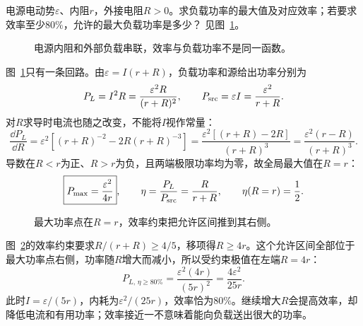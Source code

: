 \begin{exercise}[负载功率与效率的不同极值]\label{ex:c1-h8}
电源电动势$\varepsilon$、内阻$r$，外接电阻$R>0$。求负载功率的最大值及对应效率；若要求效率至少$80\%$，允许的最大负载功率是多少？ 见图~\ref{fig:c1-h8-q}。
\end{exercise}

\begin{figure}[H]\centering
{}
\caption{电源内阻和外部负载串联，效率与负载功率不是同一函数。}\label{fig:c1-h8-q}
\end{figure}
\begin{solution}
图~\ref{fig:c1-h8-q}只有一条回路。由$\varepsilon=I(r+R)$，负载功率和源给出功率分别为
\[
 P_L=I^2R=\frac{\varepsilon^2R}{(r+R)^2},\qquad
 P_{\rm src}=\varepsilon I=\frac{\varepsilon^2}{r+R}.
\]
对$R$求导时电流也随之改变，不能将$I$视作常量：
\[
 \frac{\dd P_L}{\dd R}
 =\varepsilon^2\left[(r+R)^{-2}-2R(r+R)^{-3}\right]
 =\frac{\varepsilon^2[(r+R)-2R]}{(r+R)^3}
 =\frac{\varepsilon^2(r-R)}{(r+R)^3}.
\]
导数在$R<r$为正、$R>r$为负，且两端极限功率均为零，故全局最大值在$R=r$：
\[
 \boxed{P_{\max}=\frac{\varepsilon^2}{4r}},\qquad
 \eta=\frac{P_L}{P_{\rm src}}=\frac R{r+R},\qquad \eta(R=r)=\frac12.
\]
\begin{figure}[H]\centering
{}
\caption{最大功率点在$R=r$，效率约束把允许区间推到其右侧。}\label{fig:c1-h8-s}
\end{figure}
图~\ref{fig:c1-h8-s}的效率约束要求$R/(r+R)\ge4/5$，移项得$R\ge4r$。这个允许区间全部位于最大功率点右侧，功率随$R$增大而减小，所以受约束极值在左端$R=4r$：
\[
 \boxed{P_{L,\,\eta\ge80\%}=\frac{\varepsilon^2(4r)}{(5r)^2}
 =\frac{4\varepsilon^2}{25r}}.
\]
此时$I=\varepsilon/(5r)$，内耗为$\varepsilon^2/(25r)$，效率恰为$80\%$。继续增大$R$会提高效率，却降低电流和有用功率；效率接近一不意味着能向负载送出很大的功率。
\end{solution}
